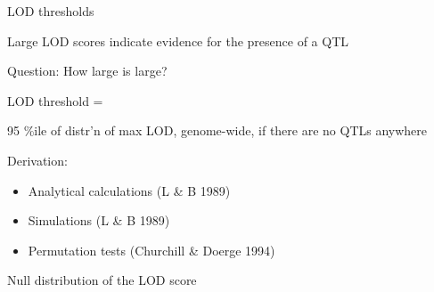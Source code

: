 \documentclass[12pt]{article}
\newcommand{\headsize}{\fontsize{35}{35} \selectfont}
\newcommand{\smallersize}{\fontsize{20}{25} \selectfont}
\begin{document}
\newpage

\headsize \color{myyellow}
\hfill \begin{minipage}{5.75in}
\centering
LOD thresholds
\end{minipage}

\smallersize \color{mywhite}

\vspace{25mm}

\hfill
\begin{minipage}{10in}
Large LOD scores indicate evidence for the presence of a QTL
\vspace{5mm}

{\color{mypink} Question}: How large is large?
\vspace{20mm}

{\color{myyellow} LOD threshold} =  \hspace{2mm}
\begin{minipage}[t]{7in}
\setlength{\rightskip}{0pt plus 1fil} %
95 \%ile of distr'n of max LOD, genome-wide, if there are no QTLs anywhere
\end{minipage}
\vspace{20mm}

\hspace{15mm} {\color{myyellow} Derivation:} \hfill
\begin{minipage}[t]{7.5in}
\begin{itemize}
\item Analytical calculations (L \& B 1989)
\item Simulations (L \& B 1989)
\item Permutation tests (Churchill \& Doerge 1994)
\end{itemize} \end{minipage}
\end{minipage}



\newpage

\headsize \color{myyellow}
\hfill \begin{minipage}{5.75in}
\centering
Null distribution of the LOD score
\end{minipage}

\vspace{3cm}
\end{document}
